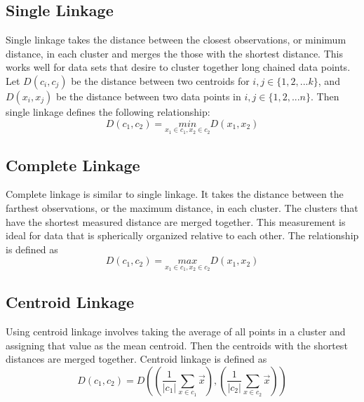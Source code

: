 \documentclass[../tech_report_1.tex]{subfiles}
\begin{document}
\subsection{Single Linkage}

Single linkage takes the distance between the closest observations,
or minimum distance, in each cluster and merges the those with the
shortest distance. This works well for data sets that desire to cluster
together long chained data points. Let $D(c_i,c_j)$ be the distance between two centroids for $i,j \in \{1, 2, ... k\}$, and $D(x_i, x_j)$ be the distance between two data points in $i, j \in \{ 1, 2, ... n \}$. Then single linkage defines the following relationship:
\begin{equation}
D(c_{1},c_{2})=\underset{x_{1}\in c_{1},x_{2}\in c_{2}}{min}D(x_{1},x_{2})
\end{equation}



\subsection{Complete Linkage}

Complete linkage is similar to single linkage. It takes the distance
between the farthest observations, or the maximum distance, in each
cluster. The clusters that have the shortest measured distance are
merged together. This measurement is ideal for data that is spherically
organized relative to each other. The relationship is defined as
\begin{equation}
D(c_{1},c_{2})=\underset{x_{1}\in c_{1},x_{2}\in c_{2}}{max}D(x_{1},x_{2})
\end{equation}



\subsection{Centroid Linkage}

Using centroid linkage involves taking the average of all points in
a cluster and assigning that value as the mean centroid. Then
the centroids with the shortest distances are merged together.
Centroid linkage is defined as
\begin{equation}
D(c_{1},c_{2})
=
D\left(
  \left(\frac{1}{|c_{1}|}\sum_{x\in c_{1}}\overset{\rightarrow}{x}\right),
  \left(\frac{1}{|c_{2}|}\sum_{x\in c_{2}}\overset{\rightarrow}{x}\right)
\right)
\end{equation}
\end{document}
